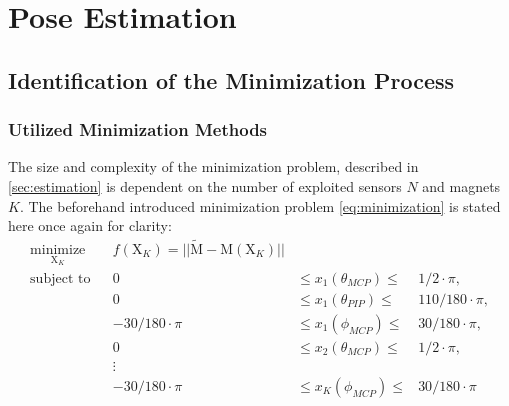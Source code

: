 \section{Pose Estimation} \label{sec:estimationRes}

\subsection{Identification of the Minimization Process} \label{subsec:resSim}

\subsubsection{Utilized Minimization Methods} \label{subsubsec:miniMethod}

The size and complexity of the minimization problem, described in \ref{sec:estimation} is dependent on the number of exploited sensors $ N $ and magnets $ K $. The beforehand introduced minimization problem \ref{eq:minimization} is stated here once again for clarity: 
\begin{equation*} \label{eq:minimization}
\begin{aligned}
\underset{\mathrm{X}_K}{\text{minimize}} & & f(\mathrm{X}_K) = || \tilde{\mathrm{M}} - \mathrm{M}(\mathrm{X}_K) ||\\
\text{subject to} & & 0 & \leq {x}_1(\theta_{MCP}) \leq & 1/2 \cdot \pi, \\
				  & & 0 & \leq {x}_1(\theta_{PIP})  \leq & 110/180 \cdot \pi, \\
				  & & -30/180 \cdot \pi & \leq {x}_1(\phi_{MCP}) \leq & 30/180 \cdot \pi, \\
				  & & 0 & \leq {x}_2(\theta_{MCP})  \leq & 1/2 \cdot \pi, \\
				  & & \vdots \\
				  & & -30/180 \cdot \pi & \leq {x}_K(\phi_{MCP}) \leq & 30/180 \cdot \pi
\end{aligned}
\end{equation*}
